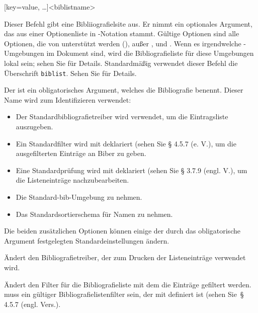 \documentclass{ltxdockit}[2011/03/25]
\newcommand*{\biber}{Biber\xspace}
\begin{document}
\begin{ltxsyntax}

[key=value, \dots]{<biblistname>}

Dieser Befehl gibt eine Bibliiografielsite aus. Er nimmt ein optionales Argument,
das aus einer Optionenliste in \keyval-Notation stammt. Gültige Optionen sind alle
Optionen, die von  unterstützt werden (),
außer ,  und . Wenn es
irgendwelche -Umgebungen im Dokument sind, wird die Bibliografieliste
für diese Umgebungen lokal sein; sehen Sie  für Details. 
Standardmäßig verwendet dieser Befehl die Überschrift \texttt{biblist}. Sehen
Sie  für Details.

Der  ist ein obligatorisches Argument, welches die Bibliografie
benennt. Dieser Name wird zum Identifizieren verwendet:
\begin{itemize}
\item Der Standardbibliografietreiber wird verwendet, um die Eintragsliste auszugeben. 
\item Ein Standardfilter wird mit  deklariert (sehen
Sie § 4.5.7 (e. V.), %
um die ausgefilterten Einträge an \biber zu geben.
\item Eine Standardprüfung wird mit  deklariert (sehen Sie %
    § 3.7.9 (engl. V.),   um die Listeneinträge nachzubearbeiten. 
\item Die Standard-bib-Umgebung zu nehmen.
\item Das Standardsortierschema für Namen zu nehmen.
\end{itemize}

Die beiden zusätzlichen Optionen können einige der durch das obligatorische Argument festgelegten
Standardeinstellungen ändern.

\begin{optionlist*}

Ändert den Bibliografietreiber, der zum Drucken der Listeneinträge verwendet wird.


Ändert den Filter für die Bibliografieliste mit dem die Einträge gefiltert werden.  
muss ein gültiger Bibliografielistenfilter sein, der mit  definiert ist (sehen  %
    Sie~§ 4.5.7 (engl. Vers.).
\end{optionlist*}


\end{ltxsyntax}
\end{document}
